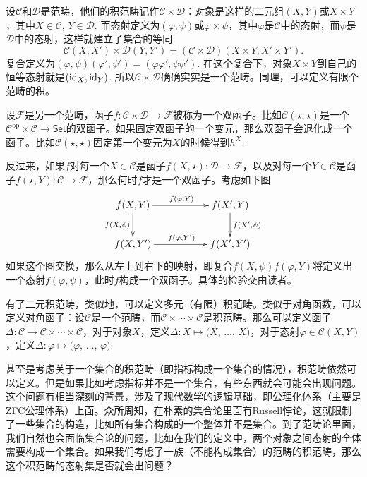 \para 设$\mathcal{C}$和$\mathcal{D}$是范畴，他们的积范畴记作$\mathcal{C}\times\mathcal{D}$：对象是这样的二元组$(X,Y)$或$X\times Y$，其中$X\in \mathcal{C}$, $Y\in\mathcal{D}$. 而态射定义为$(\varphi,\psi)$或$\varphi\times \psi$，其中$\varphi$是$\mathcal{C}$中的态射，而$\psi$是$\mathcal{D}$中的态射，这样就建立了集合的等同
\[
	{\mathcal{C}}(X,X')\times {\mathcal{D}}(Y,Y')=(\mathcal{C}\times \mathcal{D})(X\times Y,X'\times Y').
\]
复合定义为$(\varphi,\psi)(\varphi',\psi')=(\varphi\varphi',\psi\psi')$. 在这个复合下，对象$X\times Y$到自己的恒等态射就是$(\operatorname{id}_X,\operatorname{id}_Y)$. 所以$\mathcal{C}\times\mathcal{D}$确确实实是一个范畴。同理，可以定义有限个范畴的积。

设$\mathcal{F}$是另一个范畴，函子$f:\mathcal{C}\times \mathcal{D}\to \mathcal{F}$被称为一个双函子。比如$\mathcal{C}(\star,\star)$是一个$\mathcal{C}^\text{op}\times \mathcal{C}\to \mathsf{Set}$的双函子。如果固定双函子的一个变元，那么双函子会退化成一个函子。比如$\mathcal{C}(\star,\star)$固定第一个变元为$X$的时候得到$h^X$.

反过来，如果$f$对每一个$X\in \mathcal{C}$是函子$f(X,\star):\mathcal{D}\to \mathcal{F}$，以及对每一个$Y\in \mathcal{C}$是函子$f(\star,Y):\mathcal{C}\to \mathcal{F}$，那么何时$f$才是一个双函子。考虑如下图
\[
\begin{xy}
	\xymatrix{
		f(X,Y)\ar[rr]^{f(\varphi,Y)} \ar[d]_{f(X,\psi)}&&f(X',Y) \ar[d]^{f(X',\psi)}\\
		f(X,Y')\ar[rr]^{f(\varphi,Y')}&&f(X',Y')
	}
\end{xy}
\]
如果这个图交换，那么从左上到右下的映射，即复合$f(X,\psi)f(\varphi,Y)$将定义出一个态射$f(\varphi,\psi)$，此时$f$构成一个双函子。具体的检验交由读者。

\para \label{digf} 有了二元积范畴，类似地，可以定义多元（有限）积范畴。类似于对角函数，可以定义对角函子：设$\mathcal{C}$是一个范畴，而$\mathcal{C}\times \cdots \times \mathcal{C}$是积范畴。那么可以定义函子$\Delta:\mathcal{C}\to \mathcal{C}\times \cdots \times \mathcal{C}$，对于对象$X$，定义$\Delta:X\mapsto (X$, $\dots$, $X)$，对于态射$\varphi\in \mathcal{C}(X,Y)$，定义$\Delta: \varphi \mapsto (\varphi$, $\dots$, $\varphi)$.
\endpara

甚至是考虑关于一个集合的积范畴（即指标构成一个集合的情况），积范畴依然可以定义。但是如果比如考虑指标并不是一个集合，有些东西就会可能会出现问题。这个问题有相当深刻的背景，涉及了现代数学的逻辑基础，即公理化体系（主要是ZFC公理体系）上面。众所周知，在朴素的集合论里面有Russell悖论，这就限制了一些集合的构造，比如所有集合构成的一个整体并不是集合。到了范畴论里面，我们自然也会面临集合论的问题，比如在我们的定义中，两个对象之间态射的全体需要构成一个集合。如果我们考虑了一族（不能构成集合）的范畴的积范畴，那么这个积范畴的态射集是否就会出问题？

